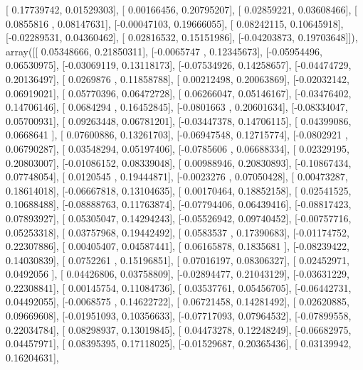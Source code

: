 \documentclass{article}
\begin{document}
       [ 0.17739742,  0.01529303],
       [ 0.00166456,  0.20795207],
       [ 0.02859221,  0.03608466],
       [ 0.0855816 ,  0.08147631],
       [-0.00047103,  0.19666055],
       [ 0.08242115,  0.10645918],
       [-0.02289531,  0.04360462],
       [ 0.02816532,  0.15151986],
       [-0.04203873,  0.19703648]]), array([[ 0.05348666,  0.21850311],
       [-0.0065747 ,  0.12345673],
       [-0.05954496,  0.06530975],
       [-0.03069119,  0.13118173],
       [-0.07534926,  0.14258657],
       [-0.04474729,  0.20136497],
       [ 0.0269876 ,  0.11858788],
       [ 0.00212498,  0.20063869],
       [-0.02032142,  0.06919021],
       [ 0.05770396,  0.06472728],
       [ 0.06266047,  0.05146167],
       [-0.03476402,  0.14706146],
       [ 0.0684294 ,  0.16452845],
       [-0.0801663 ,  0.20601634],
       [-0.08334047,  0.05700931],
       [ 0.09263448,  0.06781201],
       [-0.03447378,  0.14706115],
       [ 0.04399086,  0.0668641 ],
       [ 0.07600886,  0.13261703],
       [-0.06947548,  0.12715774],
       [-0.0802921 ,  0.06790287],
       [ 0.03548294,  0.05197406],
       [-0.0785606 ,  0.06688334],
       [ 0.02329195,  0.20803007],
       [-0.01086152,  0.08339048],
       [ 0.00988946,  0.20830893],
       [-0.10867434,  0.07748054],
       [ 0.0120545 ,  0.19444871],
       [-0.0023276 ,  0.07050428],
       [ 0.00473287,  0.18614018],
       [-0.06667818,  0.13104635],
       [ 0.00170464,  0.18852158],
       [ 0.02541525,  0.10688488],
       [-0.08888763,  0.11763874],
       [-0.07794406,  0.06439416],
       [-0.08817423,  0.07893927],
       [ 0.05305047,  0.14294243],
       [-0.05526942,  0.09740452],
       [-0.00757716,  0.05253318],
       [ 0.03757968,  0.19442492],
       [ 0.0583537 ,  0.17390683],
       [-0.01174752,  0.22307886],
       [ 0.00405407,  0.04587441],
       [ 0.06165878,  0.1835681 ],
       [-0.08239422,  0.14030839],
       [ 0.0752261 ,  0.15196851],
       [ 0.07016197,  0.08306327],
       [ 0.02452971,  0.0492056 ],
       [ 0.04426806,  0.03758809],
       [-0.02894477,  0.21043129],
       [-0.03631229,  0.22308841],
       [ 0.00145754,  0.11084736],
       [ 0.03537761,  0.05456705],
       [-0.06442731,  0.04492055],
       [-0.0068575 ,  0.14622722],
       [ 0.06721458,  0.14281492],
       [ 0.02620885,  0.09669608],
       [-0.01951093,  0.10356633],
       [-0.07717093,  0.07964532],
       [-0.07899558,  0.22034784],
       [ 0.08298937,  0.13019845],
       [ 0.04473278,  0.12248249],
       [-0.06682975,  0.04457971],
       [ 0.08395395,  0.17118025],
       [-0.01529687,  0.20365436],
       [ 0.03139942,  0.16204631],
\end{document}
